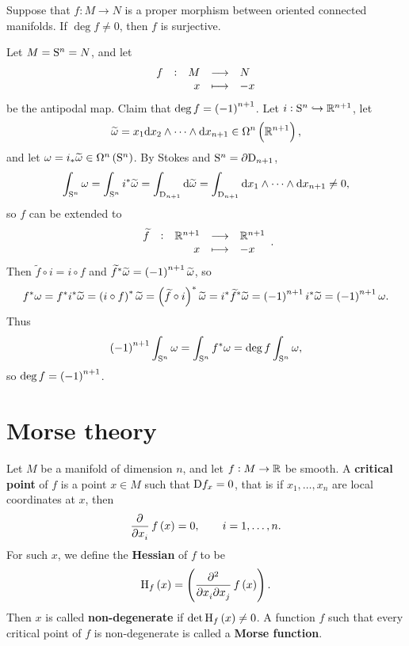 \pagebreak

\begin{exercise*}
Suppose that $ f : M \to N $ is a proper morphism between oriented connected manifolds. If $ \deg f \ne 0 $, then $ f $ is surjective.
\end{exercise*}

\begin{example}
Let $ M = \S^n = N $, and let
$$ \function[f]{M}{N}{x}{-x} $$
be the antipodal map. Claim that $ \deg f = \br{-1}^{n + 1} $. Let $ i : \S^n \hookrightarrow \RR^{n + 1} $, let
$$ \widetilde{\omega} = x_1\d x_2 \wedge \dots \wedge \d x_{n + 1} \in \Omega^n\br{\RR^{n + 1}}, $$
and let $ \omega = i_*\widetilde{\omega} \in \Omega^n\br{\S^n} $. By Stokes and $ \S^n = \da\D_{n + 1} $,
$$ \int_{\S^n} \omega = \int_{\S^n} i^*\widetilde{\omega} = \int_{\D_{n + 1}} \d\widetilde{\omega} = \int_{\D_{n + 1}} \d x_1 \wedge \dots \wedge \d x_{n + 1} \ne 0, $$
so $ f $ can be extended to
$$ \function[\widetilde{f}]{\RR^{n + 1}}{\RR^{n + 1}}{x}{-x}. $$
Then $ \widetilde{f} \circ i = i \circ f $ and $ \widetilde{f}^*\widetilde{\omega} = \br{-1}^{n + 1}\widetilde{\omega} $, so
$$ f^*\omega = f^*i^*\widetilde{\omega} = \br{i \circ f}^*\widetilde{\omega} = \br{\widetilde{f} \circ i}^*\widetilde{\omega} = i^*\widetilde{f}^*\widetilde{\omega} = \br{-1}^{n + 1}i^*\widetilde{\omega} = \br{-1}^{n + 1}\omega. $$
Thus
$$ \br{-1}^{n + 1}\int_{\S^n} \omega = \int_{\S^n} f^*\omega = \deg f\int_{\S^n} \omega, $$
so $ \deg f = \br{-1}^{n + 1} $.
\end{example}

\pagebreak

\section{Morse theory}

\begin{definition}
Let $ M $ be a manifold of dimension $ n $, and let $ f : M \to \RR $ be smooth. A \textbf{critical point} of $ f $ is a point $ x \in M $ such that $ \D f_x = 0 $, that is if $ x_1, \dots, x_n $ are local coordinates at $ x $, then
$$ \dpd{}{x_i}f\br{x} = 0, \qquad i = 1, \dots, n. $$
For such $ x $, we define the \textbf{Hessian} of $ f $ to be
$$ \H_f\br{x} = \br{\dmd{}{2}{x_i}{}{x_j}{}f\br{x}}. $$
Then $ x $ is called \textbf{non-degenerate} if $ \det \H_f\br{x} \ne 0 $. A function $ f $ such that every critical point of $ f $ is non-degenerate is called a \textbf{Morse function}.
\end{definition}

